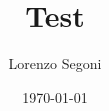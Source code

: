 \documentclass[12pt,a4paper]{book}
\numberwithin{equation}{chapter}
\theoremstyle{definition}
\theoremstyle{plain}
\begin{document}
\frontmatter
\title{Test}
\author{Lorenzo Segoni}
\date{\today}
\maketitle

\tableofcontents

\mainmatter





\end{document}
